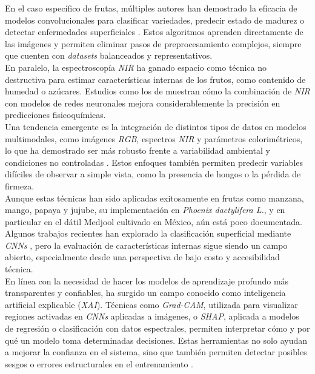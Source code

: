 En el caso específico de frutas, múltiples autores han demostrado la eficacia de modelos convolucionales para clasificar variedades, predecir estado de madurez o detectar enfermedades superficiales \parencite{rybacki_convolutional_2024, gill_fruit_2023, almomen_date_2023}. Estos algoritmos aprenden directamente de las imágenes y permiten eliminar pasos de preprocesamiento complejos, siempre que cuenten con \textit{datasets} balanceados y representativos.\\

En paralelo, la espectroscopía \textit{NIR} ha ganado espacio como técnica no destructiva para estimar características internas de los frutos, como contenido de humedad o azúcares. Estudios como los de \parencite{yuan_determination_2025, wang_improving_2025, chen_prediction_2024} muestran cómo la combinación de \textit{NIR} con modelos de redes neuronales mejora considerablemente la precisión en predicciones fisicoquímicas.\\

Una tendencia emergente es la integración de distintos tipos de datos en modelos multimodales, como imágenes \textit{RGB}, espectros \textit{NIR} y parámetros colorimétricos, lo que ha demostrado ser más robusto frente a variabilidad ambiental y condiciones no controladas \parencite{said_smartripen_2025, passos_deep_2023}. Estos enfoques también permiten predecir variables difíciles de observar a simple vista, como la presencia de hongos o la pérdida de firmeza.\\

Aunque estas técnicas han sido aplicadas exitosamente en frutas como manzana, mango, papaya y jujube, su implementación en \textit{Phoenix dactylifera L.}, y en particular en el dátil Medjool cultivado en México, aún está poco documentada. Algunos trabajos recientes han explorado la clasificación superficial mediante \textit{CNNs} \parencite{perez-perez_evaluation_2021}, pero la evaluación de características internas sigue siendo un campo abierto, especialmente desde una perspectiva de bajo costo y accesibilidad técnica.\\

En línea con la necesidad de hacer los modelos de aprendizaje profundo más transparentes y confiables, ha surgido un campo conocido como inteligencia artificial explicable (\textit{XAI}). Técnicas como \textit{Grad-CAM}, utilizada para visualizar regiones activadas en \textit{CNNs} aplicadas a imágenes, o \textit{SHAP}, aplicada a modelos de regresión o clasificación con datos espectrales, permiten interpretar cómo y por qué un modelo toma determinadas decisiones. Estas herramientas no solo ayudan a mejorar la confianza en el sistema, sino que también permiten detectar posibles sesgos o errores estructurales en el entrenamiento \parencite{russel_wavelet_2024, gupta_fruveg-net_2024}.\\


